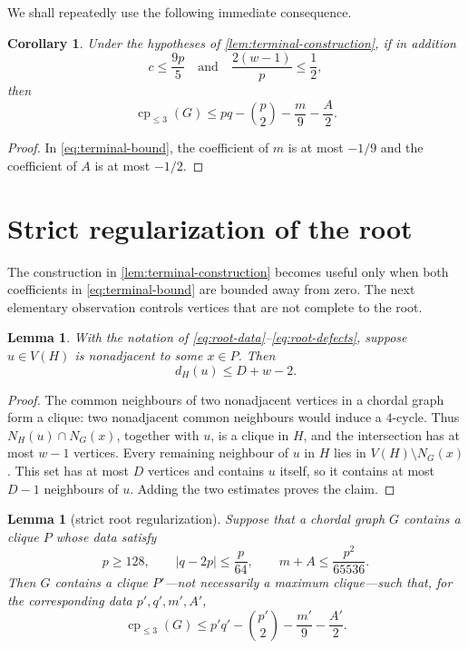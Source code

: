 \documentclass[11pt,reqno]{amsart}
\numberwithin{equation}{section}
\newtheorem{lemma}[theorem]{Lemma}
\newtheorem{corollary}[theorem]{Corollary}
\theoremstyle{definition}
\theoremstyle{remark}
\newcommand{\cple}[1]{\operatorname{cp}_{\leq #1}}
\begin{document}
We shall repeatedly use the following immediate consequence.

\begin{corollary}\label{cor:strict-terminal-bound}
Under the hypotheses of \cref{lem:terminal-construction}, if in addition
\[
  c\leq\frac{9p}{5}
  \quad\text{and}\quad
  \frac{2(w-1)}p\leq\frac12,
\]
then
\begin{equation}\label{eq:strict-terminal-bound}
  \cple{3}(G)\leq pq-\binom p2-\frac m9-\frac A2.
\end{equation}
\end{corollary}

\begin{proof}
In \eqref{eq:terminal-bound}, the coefficient of $m$ is at most $-1/9$ and
the coefficient of $A$ is at most $-1/2$.
\end{proof}

\section{Strict regularization of the root}

The construction in \cref{lem:terminal-construction} becomes useful only when
both coefficients in \eqref{eq:terminal-bound} are bounded away from zero.
The next elementary observation controls vertices that are not complete to the
root.

\begin{lemma}\label{lem:nonadjacency}
With the notation of \eqref{eq:root-data}--\eqref{eq:root-defects}, suppose
$u\in V(H)$ is nonadjacent to some $x\in P$.  Then
\[
  d_H(u)\leq D+w-2.
\]
\end{lemma}

\begin{proof}
The common neighbours of two nonadjacent vertices in a chordal graph form a
clique: two nonadjacent common neighbours would induce a $4$-cycle.  Thus
$N_H(u)\cap N_G(x)$, together with $u$, is a clique in $H$, and the
intersection has at most $w-1$ vertices.  Every remaining neighbour of $u$ in
$H$ lies in $V(H)\setminus N_G(x)$.  This set has at most $D$ vertices and
contains $u$ itself, so it contains at most $D-1$ neighbours of $u$.  Adding
the two estimates proves the claim.
\end{proof}

\begin{lemma}[strict root regularization]\label{lem:root-regularization}
Suppose that a chordal graph $G$ contains a clique $P$ whose data satisfy
\begin{equation}\label{eq:regularization-hypotheses}
  p\geq128,\qquad |q-2p|\leq\frac p{64},\qquad
  m+A\leq\frac{p^2}{65536}.
\end{equation}
Then $G$ contains a clique $P'$---not necessarily a maximum clique---such that,
for the corresponding data $p',q',m',A'$,
\begin{equation}\label{eq:regularized-bound}
  \cple{3}(G)
  \leq p'q'-\binom{p'}2-\frac{m'}9-\frac{A'}2.
\end{equation}
\end{lemma}
\end{document}
